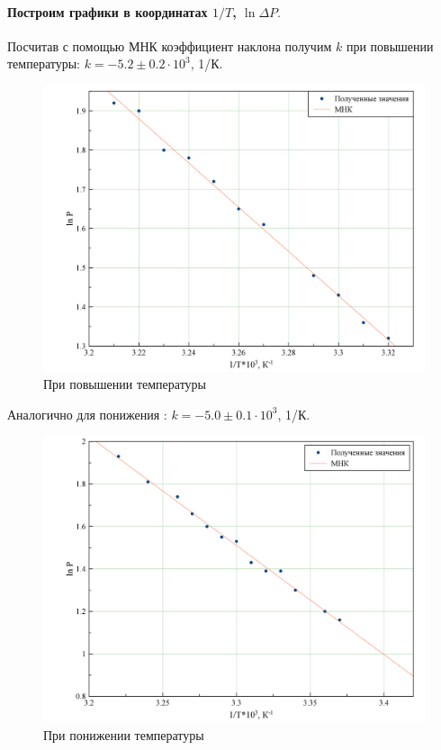 \documentclass{letnab}
\begin{document}
\paragraph{Построим графики в координатах $1/T$, $\ln \Delta P.$}
Посчитав с помощью МНК коэффициент наклона получим $k$ при повышении температуры: $k = -5.2 \pm 0.2\cdot 10^3$, 1/К.
\begin{figure}[H]
	\includegraphics[width = 135mm]{graph1.png}
	\caption{При повышении температуры}
\end{figure}
Аналогично для понижения : $k = -5.0 \pm 0.1\cdot 10^3$, 1/К.
\begin{figure}[H]
	\includegraphics[width = 135mm]{graph2.png}
	\caption{При понижении температуры}
\end{figure}
\end{document}
